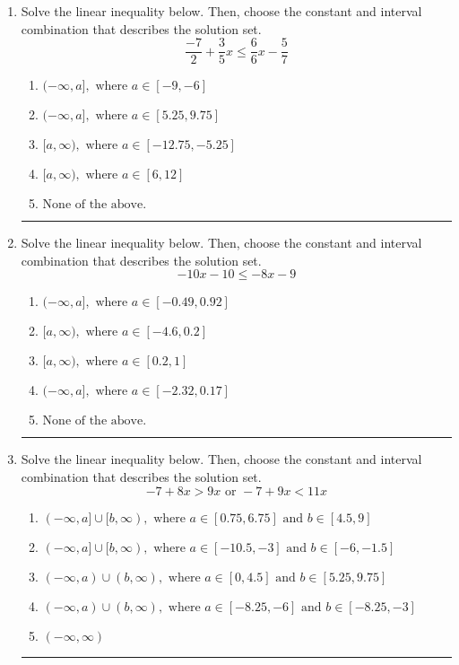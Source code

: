 \documentclass[14pt]{extbook}
\newcommand{\litem}[1]{\item#1\hspace*{-1cm}\rule{\textwidth}{0.4pt}}
\begin{document}
\begin{enumerate}
{\begin{enumerate}[label=\Alph*.]
\end{enumerate} }
\litem{
Solve the linear inequality below. Then, choose the constant and interval combination that describes the solution set.\[ \frac{-7}{2} + \frac{3}{5} x \leq \frac{6}{6} x - \frac{5}{7} \]\begin{enumerate}[label=\Alph*.]
\item \( (-\infty, a], \text{ where } a \in [-9, -6] \)
\item \( (-\infty, a], \text{ where } a \in [5.25, 9.75] \)
\item \( [a, \infty), \text{ where } a \in [-12.75, -5.25] \)
\item \( [a, \infty), \text{ where } a \in [6, 12] \)
\item \( \text{None of the above}. \)

\end{enumerate} }
\litem{
Solve the linear inequality below. Then, choose the constant and interval combination that describes the solution set.\[ -10x -10 \leq -8x -9 \]\begin{enumerate}[label=\Alph*.]
\item \( (-\infty, a], \text{ where } a \in [-0.49, 0.92] \)
\item \( [a, \infty), \text{ where } a \in [-4.6, 0.2] \)
\item \( [a, \infty), \text{ where } a \in [0.2, 1] \)
\item \( (-\infty, a], \text{ where } a \in [-2.32, 0.17] \)
\item \( \text{None of the above}. \)

\end{enumerate} }
\litem{
Solve the linear inequality below. Then, choose the constant and interval combination that describes the solution set.\[ -7 + 8 x > 9 x \text{ or } -7 + 9 x < 11 x \]\begin{enumerate}[label=\Alph*.]
\item \( (-\infty, a] \cup [b, \infty), \text{ where } a \in [0.75, 6.75] \text{ and } b \in [4.5, 9] \)
\item \( (-\infty, a] \cup [b, \infty), \text{ where } a \in [-10.5, -3] \text{ and } b \in [-6, -1.5] \)
\item \( (-\infty, a) \cup (b, \infty), \text{ where } a \in [0, 4.5] \text{ and } b \in [5.25, 9.75] \)
\item \( (-\infty, a) \cup (b, \infty), \text{ where } a \in [-8.25, -6] \text{ and } b \in [-8.25, -3] \)
\item \( (-\infty, \infty) \)


\end{enumerate}}
\end{enumerate}
\end{document}

